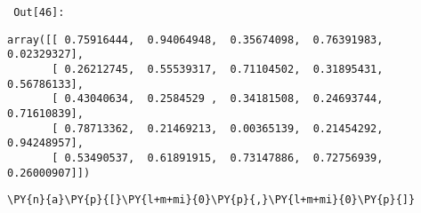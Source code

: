 \par\vspace{1\smallerfontscale}%
    
        {\par%
        \vspace{-1\smallerfontscale}%
        \noindent%
        \begin{minipage}{\cellleftmargin}%
    \hfill%
    {\smaller%
    \tt%
    \color{nbframe-out-prompt}%
    Out[46]:}%
    \hspace{\inputpadding}%
    \hspace{0em}%
    \hspace{3pt}%
    \end{minipage}%
        }%
    \begin{addmargin}[\cellleftmargin]{0em}%
    {\smaller%
    \vspace{-1\smallerfontscale}%
    
    
    
    \begin{verbatim}
array([[ 0.75916444,  0.94064948,  0.35674098,  0.76391983,  0.02329327],
       [ 0.26212745,  0.55539317,  0.71104502,  0.31895431,  0.56786133],
       [ 0.43040634,  0.2584529 ,  0.34181508,  0.24693744,  0.71610839],
       [ 0.78713362,  0.21469213,  0.00365139,  0.21454292,  0.94248957],
       [ 0.53490537,  0.61891915,  0.73147886,  0.72756939,  0.26000907]])
    \end{verbatim}

    
}%
    \end{addmargin}%

{\par%
\vspace{-1\baselineskip}%
}%
\begin{notebookcell}[47]%
\begin{addmargin}[\cellleftmargin]{0em}%
{\smaller%
\par%
%
\vspace{-1\smallerfontscale}%
\begin{Verbatim}[commandchars=\\\{\}]
\PY{n}{a}\PY{p}{[}\PY{l+m+mi}{0}\PY{p}{,}\PY{l+m+mi}{0}\PY{p}{]}
\end{Verbatim}
%
\par%
\vspace{-1\smallerfontscale}}%
\end{addmargin}
\end{notebookcell}

